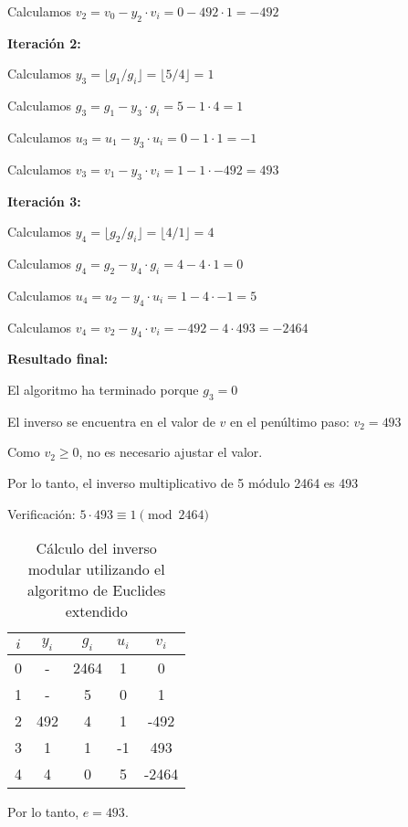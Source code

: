 Calculamos $v_2 = v_0 - y_2 \cdot v_i = 0 - 492 \cdot 1 = -492$



\textbf{Iteración 2:}

Calculamos $y_3 = \lfloor g_1 / g_i \rfloor = \lfloor 5 / 4 \rfloor = 1$

Calculamos $g_3 = g_1 - y_3 \cdot g_i = 5 - 1 \cdot 4 = 1$

Calculamos $u_3 = u_1 - y_3 \cdot u_i = 0 - 1 \cdot 1 = -1$

Calculamos $v_3 = v_1 - y_3 \cdot v_i = 1 - 1 \cdot -492 = 493$



\textbf{Iteración 3:}

Calculamos $y_4 = \lfloor g_2 / g_i \rfloor = \lfloor 4 / 1 \rfloor = 4$

Calculamos $g_4 = g_2 - y_4 \cdot g_i = 4 - 4 \cdot 1 = 0$

Calculamos $u_4 = u_2 - y_4 \cdot u_i = 1 - 4 \cdot -1 = 5$

Calculamos $v_4 = v_2 - y_4 \cdot v_i = -492 - 4 \cdot 493 = -2464$



\textbf{Resultado final:}

El algoritmo ha terminado porque $g_3 = 0$

El inverso se encuentra en el valor de $v$ en el penúltimo paso: $v_2 = 493$

Como $v_2 \geq 0$, no es necesario ajustar el valor.

Por lo tanto, el inverso multiplicativo de 5 módulo 2464 es 493

Verificación: $5 \cdot 493 \equiv 1 \pmod{2464}$

\begin{table}[h]
\centering
\begin{tabular}{|c|c|c|c|c|}
\hline
$i$ & $y_i$ & $g_i$ & $u_i$ & $v_i$ \\ \hline
0 & - & 2464 & 1 & 0 \\ \hline
1 & - & 5 & 0 & 1 \\ \hline
2 & 492 & 4 & 1 & -492 \\ \hline
3 & 1 & 1 & -1 & 493 \\ \hline
4 & 4 & 0 & 5 & -2464 \\ \hline
\end{tabular}
\caption{Cálculo del inverso modular utilizando el algoritmo de Euclides extendido}
\label{tab:euclides}
\end{table}

Por lo tanto, $e = 493$.

